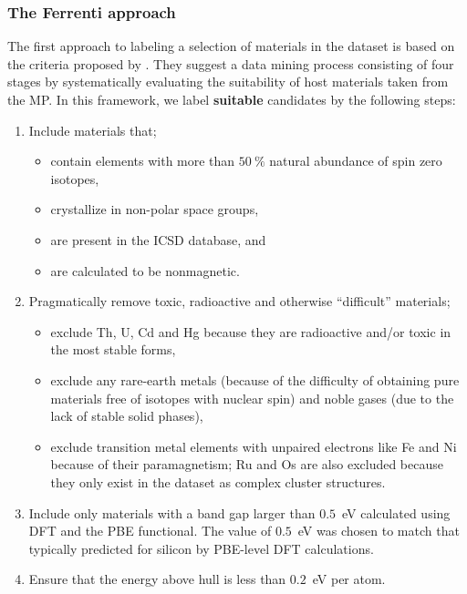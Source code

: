 \documentclass[superscriptaddress,unsortedaddress,
 amsmath,amssymb,
 aps,
]{revtex4-2}
\begin{document}
\subsubsection*{The Ferrenti approach}
The first approach to labeling a selection of materials in the dataset is based on the criteria proposed by \citeauthor{Ferrenti2020} \cite{Ferrenti2020}. 
They suggest a data mining process consisting of four stages by systematically evaluating the suitability of host materials taken from the MP. In this framework, we label \textbf{suitable} candidates by the following steps: 
\begin{enumerate}
    \item Include materials that;
    \begin{itemize}
        \item contain elements with more than $50 \ \%$ natural abundance of spin zero isotopes,
        \item crystallize in non-polar space groups,
        \item are present in the ICSD database, 
        and
        \item are calculated to be nonmagnetic. 
    \end{itemize}
    \item Pragmatically remove toxic, radioactive and otherwise ``difficult'' materials;
    \begin{itemize}
        \item exclude Th, U, Cd and Hg because they are radioactive and/or toxic in the most stable forms,
        \item exclude any rare-earth metals (because of the difficulty of obtaining pure materials free of isotopes with nuclear spin) and noble gases (due to the lack of stable solid phases),
        \item exclude transition metal elements with unpaired electrons like Fe and Ni because of their paramagnetism; Ru and Os are also excluded because they only exist in the dataset as complex cluster structures. 
    \end{itemize}
    \item Include only materials with a band gap larger than $0.5$~eV calculated using DFT and the PBE functional. The value of $0.5$~eV was chosen to match that typically predicted for silicon by PBE-level DFT calculations. 
    \item Ensure that the energy above hull is less than $0.2$~eV per atom.
\end{enumerate}
\end{document}
